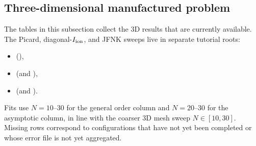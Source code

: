 \subsection{Three-dimensional manufactured problem}
The tables in this subsection collect the 3D results that are currently
available. The Picard, diagonal-$I_{\mathrm{ion}}$, and JFNK sweeps live in separate
tutorial roots:
\begin{itemize}
\item {} (),
\item {} (and ),
\item {} (and ).
\end{itemize}
Fits use $N=10$--$30$ for the general order column and
$N=20$--$30$ for the asymptotic column, in line with the
coarser 3D mesh sweep $N\in[10,30]$. Missing rows correspond to
configurations that have not yet been completed or whose error file is
not yet aggregated.

\subsubsection{}
